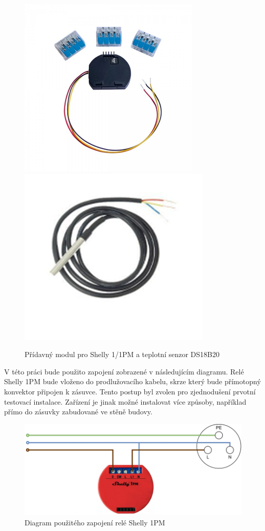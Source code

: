 \begin{figure}[hbt]
\centering
\includegraphics[width=0.33\linewidth]{obrazky-figures/shelly-tempaddon.png}
\includegraphics[width=0.33\linewidth]{obrazky-figures/shelly-tempsensor.png}
\caption{Přídavný modul pro Shelly 1/1PM a teplotní senzor DS18B20}
\end{figure}

V této práci bude použito zapojení zobrazené v následujícím diagramu. Relé Shelly 1PM bude vloženo do prodlužovacího kabelu, skrze který bude přímotopný konvektor připojen k zásuvce. Tento postup byl zvolen pro zjednodušení prvotní testovací instalace. Zařízení je jinak možné instalovat více způsoby, například přímo do zásuvky zabudované ve stěně budovy.

\begin{figure}[hbt]
\centering
\includegraphics{obrazky-figures/shelly-diagram.png}
\caption{Diagram použitého zapojení relé Shelly 1PM}
\end{figure}

